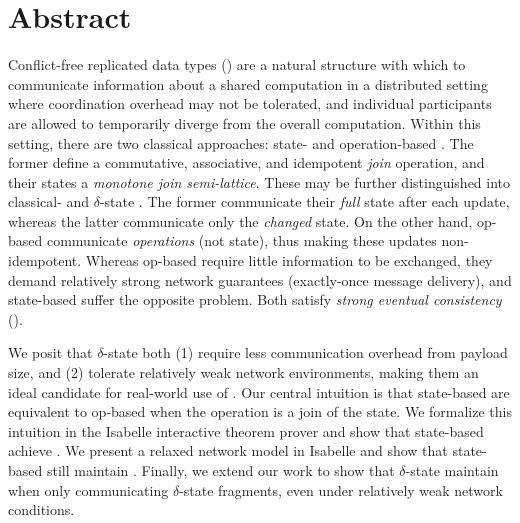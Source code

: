 \chapter*{Abstract}

Conflict-free replicated data types (\CRDTs) are a natural structure with which
to communicate information about a shared computation in a distributed setting
where coordination overhead may not be tolerated, and individual participants
are allowed to temporarily diverge from the overall computation.  Within this
setting, there are two classical approaches: state- and operation-based \CRDTs.
The former define a commutative, associative, and idempotent \textit{join}
operation, and their states a \textit{monotone join semi-lattice}. These may be
further distinguished into classical- and $\delta$-state
\CRDTs. The former communicate their \emph{full} state after
each update, whereas the latter communicate only the \emph{changed} state. On
the other hand, op-based \CRDTs communicate \emph{operations} (not state), thus
making these updates non-idempotent.  Whereas op-based \CRDTs require little
information to be exchanged, they demand relatively strong network guarantees
(exactly-once message delivery), and state-based \CRDTs suffer the opposite
problem. Both satisfy \textit{strong eventual consistency} (\SEC).

We posit that $\delta$-state \CRDTs both (1) require less communication overhead
from payload size, and (2) tolerate relatively weak network environments, making
them an ideal candidate for real-world use of \CRDTs. Our central intuition is
that state-based \CRDTs are equivalent to op-based \CRDTs when the operation is
a join of the state. We formalize this intuition in the Isabelle interactive
theorem prover and show that state-based \CRDTs achieve \SEC. We present a
relaxed network model in Isabelle and show that state-based \CRDTs still
maintain \SEC. Finally, we extend our work to show that $\delta$-state \CRDTs
maintain \SEC when only communicating $\delta$-state fragments, even under
relatively weak network conditions.
